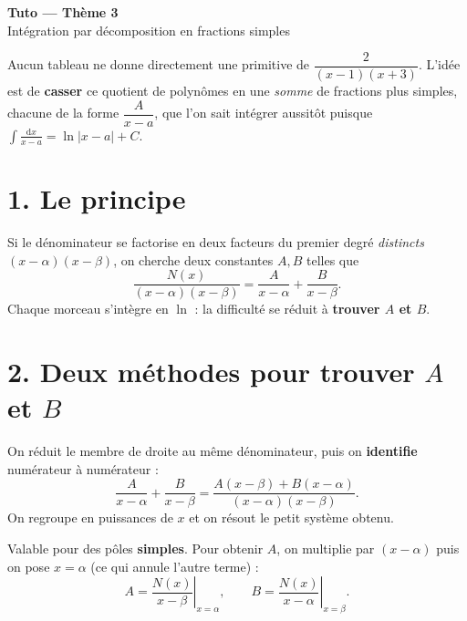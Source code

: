 \documentclass[11pt,a4paper]{article}
\newcommand{\dd}{\mathrm{d}}
\begin{document}
\begin{center}
{\LARGE\bfseries\color{primarydark}Tuto — Thème 3}\\[2pt]
{\large\color{primary}Intégration par décomposition en fractions simples}
\end{center}

\vspace{-2mm}

Aucun tableau ne donne directement une primitive de $\dfrac{2}{(x-1)(x+3)}$. L'idée est de
\textbf{casser} ce quotient de polynômes en une \emph{somme} de fractions plus simples, chacune de
la forme $\dfrac{A}{x-a}$, que l'on sait intégrer aussitôt puisque
$\displaystyle\int\frac{\dd x}{x-a}=\ln|x-a|+C$.

\section*{1. Le principe}

\begin{idee}
Si le dénominateur se factorise en deux facteurs du premier degré \emph{distincts}
$(x-\alpha)(x-\beta)$, on cherche deux constantes $A,B$ telles que
\[
\frac{N(x)}{(x-\alpha)(x-\beta)}=\frac{A}{x-\alpha}+\frac{B}{x-\beta}.
\]
Chaque morceau s'intègre en $\ln$ : la difficulté se réduit à \textbf{trouver $A$ et $B$}.
\end{idee}

\section*{2. Deux méthodes pour trouver $A$ et $B$}

\begin{methode}
On réduit le membre de droite au même dénominateur, puis on \textbf{identifie} numérateur à numérateur :
\[
\frac{A}{x-\alpha}+\frac{B}{x-\beta}=\frac{A(x-\beta)+B(x-\alpha)}{(x-\alpha)(x-\beta)}.
\]
On regroupe en puissances de $x$ et on résout le petit système obtenu.
\end{methode}

\begin{methode}
Valable pour des pôles \textbf{simples}. Pour obtenir $A$, on multiplie par $(x-\alpha)$ puis on
pose $x=\alpha$ (ce qui annule l'autre terme) :
\[
A=\left.\frac{N(x)}{x-\beta}\right|_{x=\alpha},\qquad
B=\left.\frac{N(x)}{x-\alpha}\right|_{x=\beta}.
\]
\end{methode}
\end{document}
